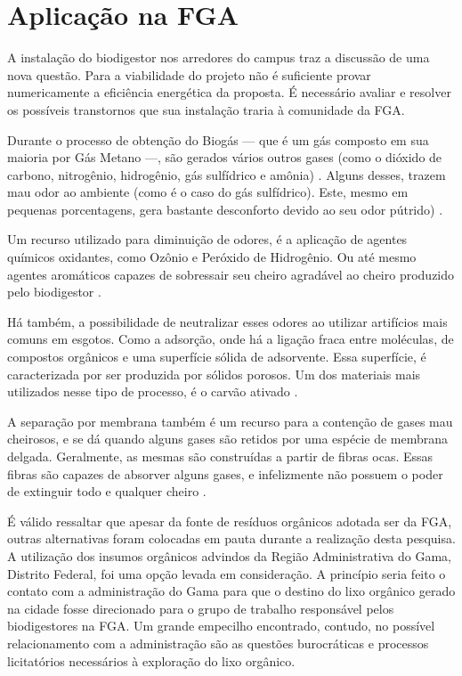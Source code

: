 \section {Aplicação na FGA}
A instalação do biodigestor nos arredores do campus traz a discussão de uma nova questão. Para a viabilidade do projeto não é suficiente provar numericamente a eficiência energética da proposta. É necessário avaliar e resolver os possíveis transtornos que sua instalação traria à comunidade da FGA.
\par Durante o processo de obtenção do Biogás — que é um gás composto em sua maioria por Gás Metano —, são gerados vários outros gases (como o dióxido de carbono, nitrogênio, hidrogênio, gás sulfídrico e amônia) \cite{treinamentobiodigestao}. Alguns desses, trazem mau odor ao ambiente (como é o caso do gás sulfídrico). Este, mesmo em pequenas porcentagens, gera bastante desconforto devido ao seu odor pútrido) \cite{viabilidadefinanceirabiogas}.
\par Um recurso utilizado para diminuição de odores, é a aplicação de agentes químicos oxidantes, como Ozônio e Peróxido de Hidrogênio. Ou até mesmo agentes aromáticos capazes de sobressair seu cheiro agradável ao cheiro produzido pelo biodigestor \cite{reduceammoniaandodor} \cite{viabilidadefinanceirabiogas}.
\par Há também, a possibilidade de neutralizar esses odores ao utilizar artifícios mais comuns em esgotos. Como a adsorção, onde há a ligação fraca entre moléculas, de compostos orgânicos e uma superfície sólida de adsorvente. Essa superfície, é caracterizada por ser produzida por sólidos porosos. Um dos materiais mais utilizados nesse tipo de processo, é o carvão ativado \cite{de2010alternativas}.
\par A separação por membrana também é um recurso para a contenção de gases mau cheirosos, e se dá quando alguns gases são retidos por uma espécie de membrana delgada. Geralmente, as mesmas são construídas a partir de fibras ocas. Essas fibras são capazes de absorver alguns gases, e infelizmente não possuem o poder de extinguir todo e qualquer cheiro \cite{de2010alternativas}.
\par É válido ressaltar que apesar da fonte de resíduos orgânicos adotada ser da FGA, outras alternativas foram colocadas em pauta durante a realização desta pesquisa. A utilização dos insumos orgânicos advindos da Região Administrativa do Gama, Distrito Federal, foi uma opção levada em consideração. A princípio seria feito o contato com a administração do Gama para que o destino do lixo orgânico gerado na cidade fosse direcionado para o grupo de trabalho responsável pelos biodigestores na FGA. Um grande empecilho encontrado, contudo, no possível relacionamento com a administração são as questões burocráticas e processos licitatórios necessários à exploração do lixo orgânico.
